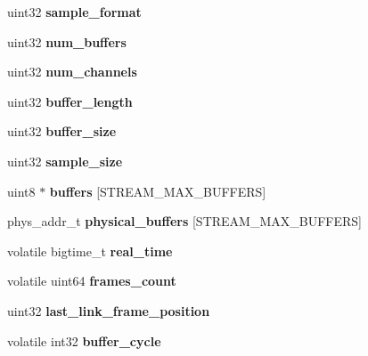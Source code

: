 \begin{DoxyCompactItemize}
uint32 {\bfseries sample\+\_\+format}
\item 
\mbox{\label{structhda__stream_af9a0091424766d8f00ee74b0aa48f766}} 
uint32 {\bfseries num\+\_\+buffers}
\item 
\mbox{\label{structhda__stream_a03825e0301fa7928e3dc0e0736def382}} 
uint32 {\bfseries num\+\_\+channels}
\item 
\mbox{\label{structhda__stream_a4bde88034cfe596a8fe32d8ea8cd6e07}} 
uint32 {\bfseries buffer\+\_\+length}
\item 
\mbox{\label{structhda__stream_a65410117e0759216b3009326a82b5d17}} 
uint32 {\bfseries buffer\+\_\+size}
\item 
\mbox{\label{structhda__stream_a968737de925139d26d99a60e05cb724f}} 
uint32 {\bfseries sample\+\_\+size}
\item 
\mbox{\label{structhda__stream_a029a4f44b2204c4863cfb94917e284a1}} 
uint8 $\ast$ {\bfseries buffers} \mbox{[}S\+T\+R\+E\+A\+M\+\_\+\+M\+A\+X\+\_\+\+B\+U\+F\+F\+E\+RS\mbox{]}
\item 
\mbox{\label{structhda__stream_ac4943bed188eed599f7562f3010fda5c}} 
phys\+\_\+addr\+\_\+t {\bfseries physical\+\_\+buffers} \mbox{[}S\+T\+R\+E\+A\+M\+\_\+\+M\+A\+X\+\_\+\+B\+U\+F\+F\+E\+RS\mbox{]}
\item 
\mbox{\label{structhda__stream_a35038d0a6875076caabebcad187c550c}} 
volatile bigtime\+\_\+t {\bfseries real\+\_\+time}
\item 
\mbox{\label{structhda__stream_ac05ac091025f43715996efc686dee269}} 
volatile uint64 {\bfseries frames\+\_\+count}
\item 
\mbox{\label{structhda__stream_a4c1cbffd16158e5fcdd54c6785238d40}} 
uint32 {\bfseries last\+\_\+link\+\_\+frame\+\_\+position}
\item 
\mbox{\label{structhda__stream_a10150de12a0646f6b63499b934411c1a}} 
volatile int32 {\bfseries buffer\+\_\+cycle}

\end{DoxyCompactItemize}
